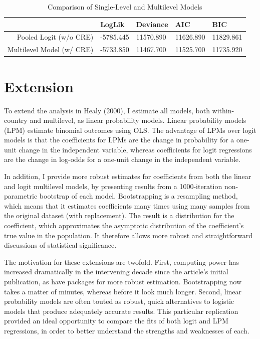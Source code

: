 \documentclass[11pt,article,oneside]{memoir}
\begin{document}
\begin{table}[h]
\caption{Comparison of Single-Level and Multilevel Models \label{tab:comp1}}
\centering
\begin{tabular}{rllll}
  \toprule
 & LogLik & Deviance & AIC & BIC \\ 
\midrule
Pooled Logit (w/o CRE) & -5785.445 & 11570.890 & 11626.890 & 11829.861 \\ 
Multilevel Model (w/ CRE) & -5733.850 & 11467.700 & 11525.700 & 11735.920 \\ 
\bottomrule
\end{tabular}
\end{table}



\section{Extension}


To extend the analysis in Healy (2000), I estimate all models, both within-country and multilevel, as linear
probability models. Linear probability models (LPM) estimate binomial
outcomes using OLS. The advantage of LPMs over logit models is that the
coefficients for LPMs are the change in probability for a one-unit
change in the independent variable, whereas coefficients for logit
regressions are the change in log-odds for a one-unit change in the
independent variable.

In addition, I provide more robust estimates for coefficients from both the linear and
logit multilevel models, by presenting results from a 1000-iteration
non-parametric bootstrap of each model. Bootstrapping is a resampling method, which means that it estimates coefficients many times using many samples from the original dataset (with replacement). The result is a distribution for the coefficient, which approximates the asymptotic distribution of the coefficient's true value in the population. It therefore allows more robust and straightforward discussions of statistical significance. 

The motivation for these extensions are twofold. First, computing power
has increased dramatically in the intervening decade since the article's
initial publication, as have packages for more robust estimation. Bootstrapping now takes a matter of minutes, whereas before it look much longer.
Second, linear probability models are often touted as robust, quick
alternatives to logistic models that produce adequately accurate
results. This particular replication provided an ideal opportunity to compare the fits of both logit and LPM regressions, in order to better understand the strengths and weaknesses of each.
\end{document}
